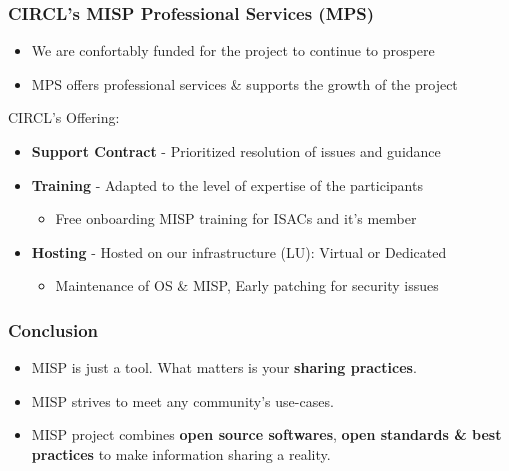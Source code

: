 \begin{frame}
    \frametitle{CIRCL's MISP Professional Services (MPS)}
    \begin{itemize}
        \item We are confortably funded for the project to continue to prospere
        \item MPS offers professional services \& supports the growth of the project
    \end{itemize}
    \vspace{1em}
    CIRCL's Offering:
    \begin{itemize}
        \item \textbf{Support Contract} - Prioritized resolution of issues and guidance
        \item \textbf{Training} - Adapted to the level of expertise of the participants
            \begin{itemize}
                \item {\small Free onboarding MISP training for ISACs and it's member}
            \end{itemize}
            \item \textbf{Hosting} - Hosted on our infrastructure (LU): Virtual or Dedicated
            \begin{itemize}
                \item {\small Maintenance of OS \& MISP, Early patching for security issues}
            \end{itemize}
    \end{itemize}
\end{frame}

\begin{frame}
    \frametitle{Conclusion}
    \begin{itemize}
            \item MISP is just a tool. What matters is your {\bf sharing practices}.
            \item MISP strives to meet any community's use-cases.
            \item MISP project combines {\bf open source softwares}, {\bf open standards \& best practices} to make information sharing a reality.
    \end{itemize}
\end{frame}




